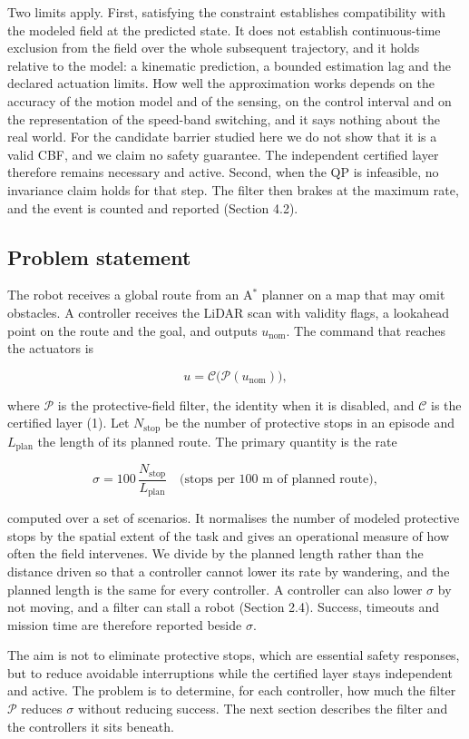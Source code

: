 Two limits apply. First, satisfying the constraint establishes compatibility with the modeled field at the predicted state. It does not establish continuous-time exclusion from the field over the whole subsequent trajectory, and it holds relative to the model: a kinematic prediction, a bounded estimation lag and the declared actuation limits. How well the approximation works depends on the accuracy of the motion model and of the sensing, on the control interval and on the representation of the speed-band switching, and it says nothing about the real world. For the candidate barrier studied here we do not show that it is a valid CBF, and we claim no safety guarantee. The independent certified layer therefore remains necessary and active. Second, when the QP is infeasible, no invariance claim holds for that step. The filter then brakes at the maximum rate, and the event is counted and reported (Section 4.2).

\subsection{Problem statement}

The robot receives a global route from an A$^{*}$ planner on a map that may omit obstacles. A controller receives the LiDAR scan with validity flags, a lookahead point on the route and the goal, and outputs $u_{\mathrm{nom}}$. The command that reaches the actuators is

\begin{equation*}
u = \mathcal{C}\big(\mathcal{P}(u_{\mathrm{nom}})\big),
\tag{4}
\end{equation*}

where $\mathcal{P}$ is the protective-field filter, the identity when it is disabled, and $\mathcal{C}$ is the certified layer (1). Let $N_{\mathrm{stop}}$ be the number of protective stops in an episode and $L_{\mathrm{plan}}$ the length of its planned route. The primary quantity is the rate

\begin{equation*}
\sigma = 100\, \frac{N_{\mathrm{stop}}}{L_{\mathrm{plan}}} \quad \text{(stops per 100 m of planned route)},
\tag{5}
\end{equation*}

computed over a set of scenarios. It normalises the number of modeled protective stops by the spatial extent of the task and gives an operational measure of how often the field intervenes. We divide by the planned length rather than the distance driven so that a controller cannot lower its rate by wandering, and the planned length is the same for every controller. A controller can also lower $\sigma$ by not moving, and a filter can stall a robot (Section 2.4). Success, timeouts and mission time are therefore reported beside $\sigma$.

The aim is not to eliminate protective stops, which are essential safety responses, but to reduce avoidable interruptions while the certified layer stays independent and active. The problem is to determine, for each controller, how much the filter $\mathcal{P}$ reduces $\sigma$ without reducing success. The next section describes the filter and the controllers it sits beneath.
